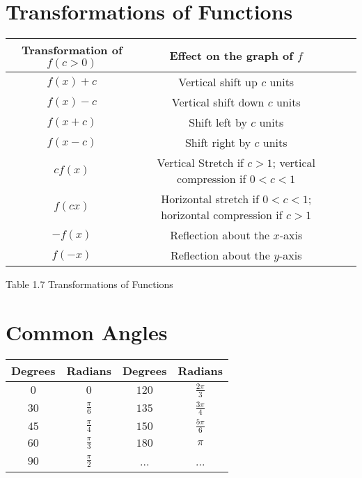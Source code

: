 \documentclass{book}
\begin{document}
\newpage

\section{Transformations of Functions}

\begin{table}[h]
    \centering
    \begin{tabular}{|c|c|c|c|}
    \hline
    Transformation of \(f(c>0)\) & Effect on the graph of \(f\) \\
    \hline
   \(f(x)+c\) & Vertical shift up \(c\) units \\
    \hline
    \(f(x)-c\) & Vertical shift down \(c\) units \\
    \hline
    \(f(x+c)\) & Shift left by \(c\) units \\
    \hline
    \(f(x-c)\) & Shift right by \(c\) units \\
    \hline
	\(cf(x)\) & Vertical Stretch if \(c>1\); vertical compression if \(0<c<1\) \\
	\hline
	\(f(cx)\) & Horizontal stretch if \(0<c<1\); horizontal compression if \(c>1\) \\
	\hline
	\(-f(x)\) & Reflection about the \(x\)-axis \\
	\hline
	\(f(-x)\) & Reflection about the \(y\)-axis \\
	\hline
    \end{tabular}
    \end{table}

	Table 1.7 Transformations of Functions

	\section{Common Angles}

	\begin{table}[h]
		\centering
		\begin{tabular}{|c|c|c|c|}
		\hline
		Degrees & Radians & Degrees & Radians \\
		\hline
	   \(0\) & \(0\) & \(120\) & \(\frac{2\pi}{3}\) \\
	   \hline
	\(30\) & \(\frac{\pi}{6}\) & \(135\) & \(\frac{3\pi}{4}\) \\
	\hline
	\(45\) & \(\frac{\pi}{4}\) & \(150\) & \(\frac{5\pi}{6}\) \\
	\hline
	\(60\) & \(\frac{\pi}{3}\) & \(180\) & \(\pi\) \\
	\hline
	\(90\) & \(\frac{\pi}{2}\) & ... & ... \\
	\hline
	\end{tabular}
	\end{table}
\end{document}
